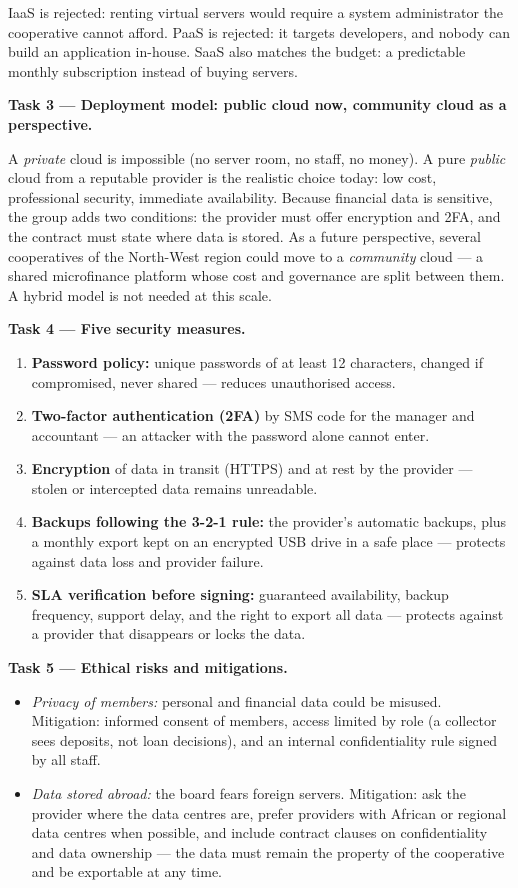\documentclass[11pt]{article}
\begin{document}
IaaS is rejected: renting virtual servers would require a system administrator the cooperative cannot afford. PaaS is rejected: it targets developers, and nobody can build an application in-house. SaaS also matches the budget: a predictable monthly subscription instead of buying servers.

\textbf{Task 3 --- Deployment model: public cloud now, community cloud as a perspective.}

A \emph{private} cloud is impossible (no server room, no staff, no money). A pure \emph{public} cloud from a reputable provider is the realistic choice today: low cost, professional security, immediate availability. Because financial data is sensitive, the group adds two conditions: the provider must offer encryption and 2FA, and the contract must state where data is stored. As a future perspective, several cooperatives of the North-West region could move to a \emph{community} cloud --- a shared microfinance platform whose cost and governance are split between them. A hybrid model is not needed at this scale.

\textbf{Task 4 --- Five security measures.}

\begin{enumerate}
\item \textbf{Password policy:} unique passwords of at least 12 characters, changed if compromised, never shared --- reduces unauthorised access.
\item \textbf{Two-factor authentication (2FA)} by SMS code for the manager and accountant --- an attacker with the password alone cannot enter.
\item \textbf{Encryption} of data in transit (HTTPS) and at rest by the provider --- stolen or intercepted data remains unreadable.
\item \textbf{Backups following the 3-2-1 rule:} the provider's automatic backups, plus a monthly export kept on an encrypted USB drive in a safe place --- protects against data loss and provider failure.
\item \textbf{SLA verification before signing:} guaranteed availability, backup frequency, support delay, and the right to export all data --- protects against a provider that disappears or locks the data.
\end{enumerate}

\textbf{Task 5 --- Ethical risks and mitigations.}

\begin{itemize}
\item \emph{Privacy of members:} personal and financial data could be misused. Mitigation: informed consent of members, access limited by role (a collector sees deposits, not loan decisions), and an internal confidentiality rule signed by all staff.
\item \emph{Data stored abroad:} the board fears foreign servers. Mitigation: ask the provider where the data centres are, prefer providers with African or regional data centres when possible, and include contract clauses on confidentiality and data ownership --- the data must remain the property of the cooperative and be exportable at any time.
\end{itemize}
\end{document}
